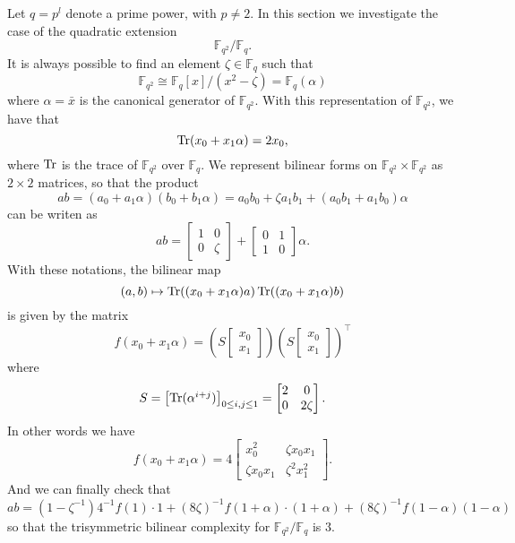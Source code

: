 \documentclass[a4paper,11pt]{article}
\begin{document}
Let $q=p^l$ denote a prime power, with $p\neq2$. In this section we investigate
the case of the quadratic extension 
\[
  \mathbb{F}_{q^2}/\mathbb{F}_q.
\]
It is always possible to find an element $\zeta\in\mathbb{F}_q$ such that 
\[
  \mathbb{F}_{q^2}\cong \mathbb{F}_{q}[x]/(x^2-\zeta)=\mathbb{F}_q(\alpha)
\]
where $\alpha=\bar x$ is the canonical generator of $\mathbb{F}_{q^2}$. With
this representation of $\mathbb{F}_{q^2}$, we have that
\[
  \operatorname{Tr}(x_0 + x_1\alpha) = 2x_0,
\]
where $\operatorname{Tr}$ is the trace of $\mathbb{F}_{q^2}$ over $\mathbb{F}_q$.
We represent
bilinear forms on $\mathbb{F}_{q^2}\times \mathbb{F}_{q^2}$ as $2\times2$
matrices, so that the product
\[
  ab = (a_0+a_1\alpha)(b_0+b_1\alpha)=a_0b_0+\zeta a_1b_1
  +(a_0b_1+a_1b_0)\alpha
\]
can be writen as
\[
  ab = 
  \begin{bmatrix}
    1 & 0 \\
    0 & \zeta
  \end{bmatrix}
  +
  \begin{bmatrix}
    0 & 1 \\
    1 & 0
  \end{bmatrix}\alpha.
\]
With these notations, the bilinear map 
\[
  (a, b)\mapsto \operatorname{Tr}((x_0+x_1\alpha)a)\operatorname{Tr}((x_0+x_1\alpha)b)
\]
is given by the matrix 
\[
  f(x_0+x_1\alpha)=
  \left(S 
  \begin{bmatrix}
    x_0 \\
    x_1
  \end{bmatrix}\right)
  \left(S 
  \begin{bmatrix}
    x_0 \\
    x_1
  \end{bmatrix}\right)^\intercal
\]
where
\[
  S =
  \begin{bmatrix}
    \operatorname{Tr}(\alpha^{i+j})
  \end{bmatrix}_{0\leq i, j\leq 1}
  =
  \begin{bmatrix}
   2 & 0 \\
   0 & 2\zeta
  \end{bmatrix}.
\]
In other words we have
\[
  f(x_0+x_1\alpha) = 
  4\begin{bmatrix}
   x_0^2 & \zeta x_0x_1 \\
   \zeta x_0 x_1 & \zeta^2 x_1^2
  \end{bmatrix}.
\]
And we can finally check that
\[
  ab = (1-\zeta^{-1})4^{-1}f(1)\cdot1 +
  (8\zeta)^{-1}f(1+\alpha)\cdot(1+\alpha)+(8\zeta)^{-1}f(1-\alpha)(1-\alpha)
\]
so that the trisymmetric bilinear complexity for
$\mathbb{F}_{q^2}/\mathbb{F}_{q}$ is $3$.



\end{document}
